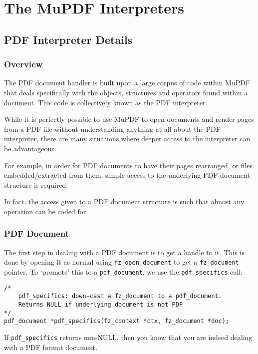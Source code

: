 \documentclass[oneside]{book}
\begin{document}
\part{The MuPDF Interpreters}
\chapter{PDF Interpreter Details}
\label{PDFInterpreter}

\section{Overview}

The PDF document handler is built upon a large corpus of code within MuPDF that deals specifically with the objects, structures and operators found within a document. This code is collectively known as the PDF interpreter.

While it is perfectly possible to use MuPDF to open documents and render pages from a PDF file without understanding anything at all about the PDF interpreter, there are many situations where deeper access to the interpreter can be advantageous.

For example, in order for PDF documents to have their pages rearranged, or files embedded/extracted from them, simple access to the underlying PDF document structure is required.

In fact, the access given to a PDF document structure is such that almost any operation can be coded for.

\section{PDF Document}

The first step in dealing with a PDF document is to get a handle to it. This is done by opening it as normal using \texttt{fz\_open\_document} to get a \texttt{fz\_document} pointer. To `promote' this to a \texttt{pdf\_document}, we use the \texttt{pdf\_specifics} call:

\begin{lstlisting}
/*
	pdf_specifics: down-cast a fz_document to a pdf_document.
	Returns NULL if underlying document is not PDF
*/
pdf_document *pdf_specifics(fz_context *ctx, fz_document *doc);
\end{lstlisting}

If \texttt{pdf\_specifics} returns non-NULL, then you know that you are indeed dealing with a PDF format document.
\end{document}
